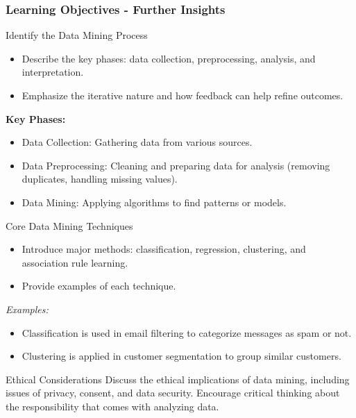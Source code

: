 \documentclass{beamer}
\begin{document}
\begin{frame}[fragile]
    \frametitle{Learning Objectives - Further Insights}
    
    \begin{block}{Identify the Data Mining Process}
        \begin{itemize}
            \item Describe the key phases: data collection, preprocessing, analysis, and interpretation.
            \item Emphasize the iterative nature and how feedback can help refine outcomes.
        \end{itemize}

        \textbf{Key Phases:}
        \begin{itemize}
            \item Data Collection: Gathering data from various sources.
            \item Data Preprocessing: Cleaning and preparing data for analysis (removing duplicates, handling missing values).
            \item Data Mining: Applying algorithms to find patterns or models.
        \end{itemize}
    \end{block}

    \begin{block}{Core Data Mining Techniques}
        \begin{itemize}
            \item Introduce major methods: classification, regression, clustering, and association rule learning.
            \item Provide examples of each technique.
        \end{itemize}

        \textit{Examples:} 
        \begin{itemize}
            \item Classification is used in email filtering to categorize messages as spam or not.
            \item Clustering is applied in customer segmentation to group similar customers.
        \end{itemize}
        
        \begin{block}{Ethical Considerations}
            Discuss the ethical implications of data mining, including issues of privacy, consent, and data security.
            Encourage critical thinking about the responsibility that comes with analyzing data.
        \end{block}
    \end{block}
\end{frame}
\end{document}
